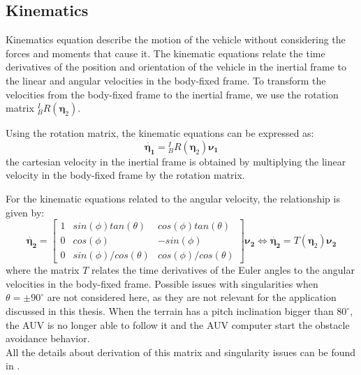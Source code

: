 \subsection{Kinematics}
Kinematics equation describe the motion of the vehicle without considering the forces and moments that cause it. The kinematic equations relate 
the time derivatives of the position and orientation of the vehicle in the inertial frame to the linear and angular velocities in the body-fixed frame. 
To transform the velocities from the body-fixed frame to the inertial frame, we use the rotation matrix $^{I}_{B}R(\mathbf{\eta}_2)$.

Using the rotation matrix, the kinematic equations can be expressed as:
\begin{equation}
    \dot{\mathbf{\eta_1}} = {}^{I}_{B}R(\mathbf{\eta}_2)\mathbf{\nu_1}
    \label{eq:kinematics_linear}
\end{equation}
the cartesian velocity in the inertial frame is obtained by multiplying the linear velocity in the body-fixed frame by the rotation matrix.

For the kinematic equations related to the angular velocity, the relationship is given by:
\begin{equation}
    \dot{\mathbf{\eta_2}} = \begin{bmatrix}
        1 & sin(\phi)tan(\theta) & cos(\phi)tan(\theta) \\
        0 & cos(\phi) & -sin(\phi) \\
        0 & sin(\phi)/cos(\theta) & cos(\phi)/cos(\theta)
    \end{bmatrix}\mathbf{\nu_2} \iff \dot{\mathbf{\eta_2}} = T(\mathbf{\eta}_2)\mathbf{\nu_2}
    \label{eq:kinematics_angular}
\end{equation}
where the matrix $T$ relates the time derivatives of the Euler angles to the angular velocities in the body-fixed frame. Possible issues with singularities 
when $\theta = \pm 90^{\circ}$ are not considered here, as they are not relevant for the application discussed in this thesis. When the terrain has a 
pitch inclination bigger than $80^{\circ}$, the AUV is no longer able to follow it and the AUV computer start the obstacle avoidance behavior.\\
All the details about derivation of this matrix and singularity issues can be found in \cite{fossenHandbookMarineCraft2011}.

